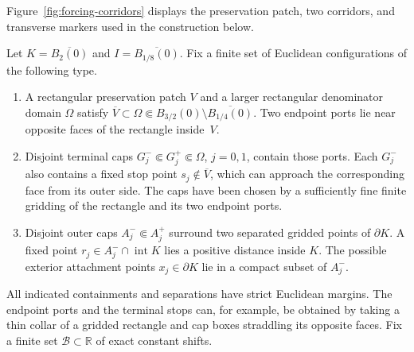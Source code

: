 Figure~\ref{fig:forcing-corridors} displays the preservation patch,
two corridors, and transverse markers used in the construction below.


\begin{lemma}
\label{comp:finite-catalogue-construction}
Let $K=\overline{B_2(0)}$ and
$I=\overline{B_{1/8}(0)}$.  Fix a finite set of Euclidean
configurations of the following type.
\begin{enumerate}[label=(\alph*)]
\item A rectangular preservation patch $V$ and a larger
      rectangular denominator domain $\Omega$ satisfy
      $\overline V\subset\Omega\Subset
      B_{3/2}(0)\setminus\overline{B_{1/4}(0)}$.
      Two endpoint ports lie near opposite faces of the
      rectangle inside~$V$.
\item Disjoint terminal caps
      $G_j^-\Subset G_j^+\Subset\Omega$, $j=0,1$, contain
      those ports.  Each $G_j^-$ also contains a fixed stop
      point $s_j\notin\overline V$, which can approach the
      corresponding face from its outer side.  The caps have
      been chosen by a sufficiently fine finite gridding of
      the rectangle and its two endpoint ports.
\item Disjoint outer caps $A_j^-\Subset A_j^+$ surround two
      separated gridded points of $\partial K$.  A fixed
      point $r_j\in A_j^-\cap\operatorname{int}K$ lies a
      positive distance inside $K$.  The possible exterior
      attachment points $x_j\in\partial K$ lie in a compact
      subset of $A_j^-$.
\end{enumerate}
All indicated containments and separations have strict
Euclidean margins.  The endpoint ports and the terminal stops
can, for example, be obtained by taking a thin collar of a
gridded rectangle and cap boxes straddling its opposite faces.
Fix a finite set $\mathcal B\subset\mathbb R$ of exact
constant shifts.


\end{lemma}
